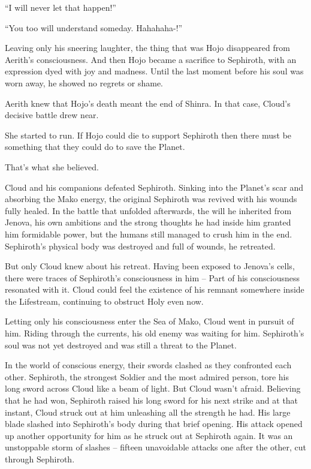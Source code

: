 \documentclass[oneside]{book}
\begin{document}
“I will never let that happen!”

“You too will understand someday. Hahahaha-!”

Leaving only his sneering laughter, the thing that was Hojo disappeared from Aerith's consciousness. And then Hojo became a sacrifice to Sephiroth, with an expression dyed with joy and madness. Until the last moment before his soul was worn away, he showed no regrets or shame.

Aerith knew that Hojo's death meant the end of Shinra. In that case, Cloud's decisive battle drew near.

She started to run. If Hojo could die to support Sephiroth then there must be something that they could do to save the Planet.

That's what she believed.

\newpage
Cloud and his companions defeated Sephiroth. Sinking into the Planet's scar and absorbing the Mako energy, the original Sephiroth was revived with his wounds fully healed. In the battle that unfolded afterwards, the will he inherited from Jenova, his own ambitions and the strong thoughts he had inside him granted him formidable power, but the humans still managed to crush him in the end. Sephiroth's physical body was destroyed and full of wounds, he retreated.

But only Cloud knew about his retreat. Having been exposed to Jenova's cells, there were traces of Sephiroth's consciousness in him – Part of his consciousness resonated with it. Cloud could feel the existence of his remnant somewhere inside the Lifestream, continuing to obstruct Holy even now.

Letting only his consciousness enter the Sea of Mako, Cloud went in pursuit of him. Riding through the currents, his old enemy was waiting for him. Sephiroth's soul was not yet destroyed and was still a threat to the Planet.

In the world of conscious energy, their swords clashed as they confronted each other. Sephiroth, the strongest Soldier and the most admired person, tore his long sword across Cloud like a beam of light. But Cloud wasn't afraid. Believing that he had won, Sephiroth raised his long sword for his next strike and at that instant, Cloud struck out at him unleashing all the strength he had. His large blade slashed into Sephiroth's body during that brief opening. His attack opened up another opportunity for him as he struck out at Sephiroth again. It was an unstoppable storm of slashes – fifteen unavoidable attacks one after the other, cut through Sephiroth.
\end{document}

